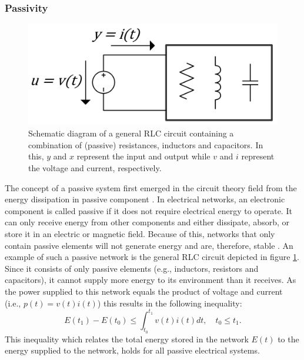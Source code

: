 \subsubsection{Passivity}

\begin{figure}
  \centering
  \includegraphics[width=0.55\linewidth]{figures/RLC_circuit.png}
  \caption[Schematic diagram of a general RLC circuit.]{Schematic diagram of a general RLC circuit containing a combination of (passive) resistances, inductors and capacitors. In this, $y$ and $x$ represent the input and output while $v$ and $i$ represent the voltage and current, respectively.} \label{fig:rlc_circuit}
\end{figure}

The concept of a passive system first emerged in the circuit theory field from the energy dissipation in passive component \cite{popovHyperstabilityControlSystems1973}. In electrical networks, an electronic component is called passive if it does not require electrical energy to operate. It can only receive energy from other components and either dissipate, absorb, or store it in an electric or magnetic field. Because of this, networks that only contain passive elements will not generate energy and are, therefore, stable \cite{andersonNetworkAnalysisSynthesis2013}. An example of such a passive network is the general RLC circuit depicted in figure \ref{fig:rlc_circuit}. Since it consists of only passive elements (e.g., inductors, resistors and capacitors), it cannot supply more energy to its environment than it receives. As the power supplied to this network equals the product of voltage and current (i.e., $p \left( t \right)= v \left( t \right) i \left( t \right)$) this results in the following inequality:
\begin{equation}
  E \left( t_1 \right)- E \left( t_0 \right)\le\int_{ t_0 }^{ t_1 } v \left( t \right) i \left( t \right)dt, \quad t_0 \le t_1.
\end{equation}
This inequality which relates the total energy stored in the network $E\left(t\right)$ to the energy supplied to the network, holds for all passive electrical systems.

